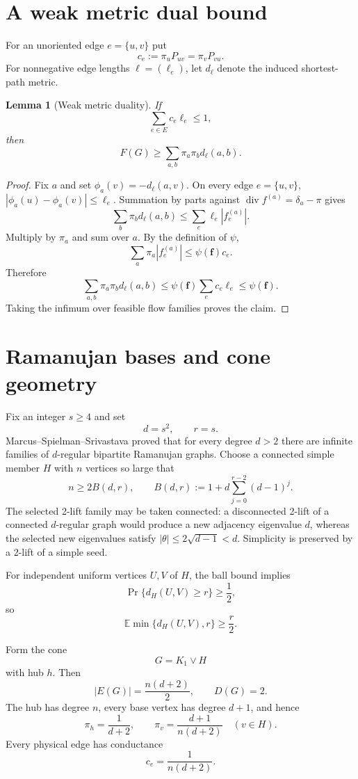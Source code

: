 \documentclass[11pt]{article}
\newtheorem{lemma}{Lemma}
\newcommand{\E}{\mathbb E}
\begin{document}
\section{A weak metric dual bound}
For an unoriented edge $e=\{u,v\}$ put
\[
 c_e:=\pi_uP_{uv}=\pi_vP_{vu}.
\]
For nonnegative edge lengths $\ell=(\ell_e)$, let $d_\ell$ denote the induced shortest-path metric.

\begin{lemma}[Weak metric duality]\label{lem:dual}
If
\[
 \sum_{e\in E}c_e\ell_e\le1,
\]
then
\[
 F(G)\ge \sum_{a,b}\pi_a\pi_b d_\ell(a,b).
\]
\end{lemma}

\begin{proof}
Fix $a$ and set $\phi_a(v)=-d_\ell(a,v)$.  On every edge $e=\{u,v\}$,
$|\phi_a(u)-\phi_a(v)|\le\ell_e$.  Summation by parts against
$\operatorname{div}f^{(a)}=\delta_a-\pi$ gives
\[
 \sum_b\pi_b d_\ell(a,b)
 \le \sum_e \ell_e |f_e^{(a)}|.
\]
Multiply by $\pi_a$ and sum over $a$.  By the definition of $\psi$,
\[
 \sum_a\pi_a|f_e^{(a)}|\le \psi(\mathbf f)c_e.
\]
Therefore
\[
 \sum_{a,b}\pi_a\pi_b d_\ell(a,b)
 \le \psi(\mathbf f)\sum_ec_e\ell_e
 \le \psi(\mathbf f).
\]
Taking the infimum over feasible flow families proves the claim.
\end{proof}

\section{Ramanujan bases and cone geometry}
Fix an integer $s\ge4$ and set
\[
 d=s^2,\qquad r=s.
\]
Marcus--Spielman--Srivastava proved that for every degree $d>2$ there are infinite families of $d$-regular bipartite Ramanujan graphs.  Choose a connected simple member $H$ with $n$ vertices so large that
\[
 n\ge2B(d,r),
 \qquad
 B(d,r):=1+d\sum_{j=0}^{r-2}(d-1)^j.
\]
The selected 2-lift family may be taken connected: a disconnected 2-lift of a connected $d$-regular graph would produce a new adjacency eigenvalue $d$, whereas the selected new eigenvalues satisfy $|\theta|\le2\sqrt{d-1}<d$.  Simplicity is preserved by a 2-lift of a simple seed.

For independent uniform vertices $U,V$ of $H$, the ball bound implies
\[
 \Pr\{d_H(U,V)\ge r\}\ge\frac12,
\]
so
\begin{equation}\label{eq:truncdist}
 \E\min\{d_H(U,V),r\}\ge\frac r2.
\end{equation}

Form the cone
\[
 G=K_1\vee H
\]
with hub $h$.  Then
\[
 |E(G)|=\frac{n(d+2)}2,
 \qquad
 D(G)=2.
\]
The hub has degree $n$, every base vertex has degree $d+1$, and hence
\begin{equation}\label{eq:pi}
 \pi_h=\frac1{d+2},
 \qquad
 \pi_v=\frac{d+1}{n(d+2)}\quad(v\in H).
\end{equation}
Every physical edge has conductance
\begin{equation}\label{eq:cond}
 c_e=\frac1{n(d+2)}.
\end{equation}
\end{document}
